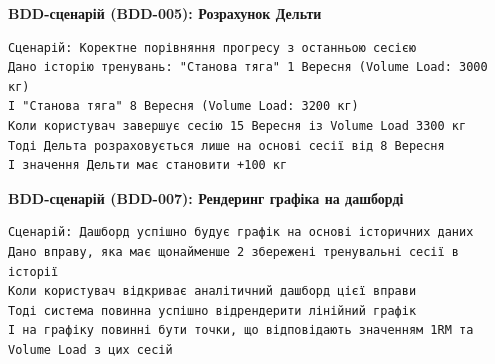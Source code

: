 \documentclass[12pt]{article}
\begin{document}
\textbf{BDD-сценарій (BDD-005): Розрахунок Дельти}
\begin{verbatim}
Сценарій: Коректне порівняння прогресу з останньою сесією
Дано історію тренувань: "Станова тяга" 1 Вересня (Volume Load: 3000 кг)
І "Станова тяга" 8 Вересня (Volume Load: 3200 кг)
Коли користувач завершує сесію 15 Вересня із Volume Load 3300 кг
Тоді Дельта розраховується лише на основі сесії від 8 Вересня
І значення Дельти має становити +100 кг
\end{verbatim}

\textbf{BDD-сценарій (BDD-007): Рендеринг графіка на дашборді}
\begin{verbatim}
Сценарій: Дашборд успішно будує графік на основі історичних даних
Дано вправу, яка має щонайменше 2 збережені тренувальні сесії в історії
Коли користувач відкриває аналітичний дашборд цієї вправи
Тоді система повинна успішно відрендерити лінійний графік
І на графіку повинні бути точки, що відповідають значенням 1RM та Volume Load з цих сесій
\end{verbatim}
\end{document}
